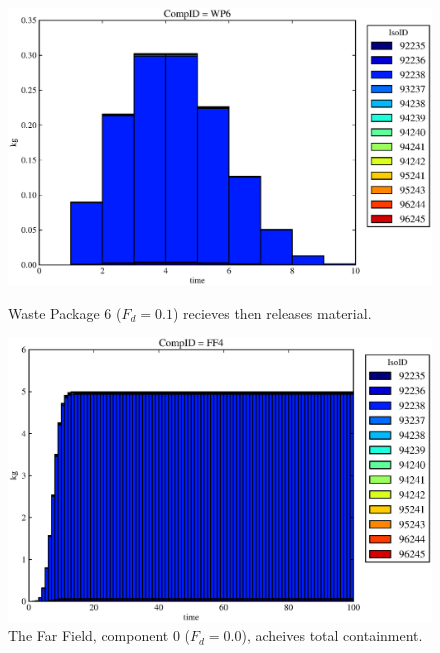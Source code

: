 \begin{figure}[ht]
\begin{minipage}[b]{0.45\linewidth}
\end{minipage}
\hspace{0.05\linewidth}
\begin{minipage}[b]{0.45\linewidth}
  \includegraphics[width=\textwidth]{./chapters/demonstration/base/drIV2.eps}
  \caption[Case DRIII Waste Package Contaminants.]{ 
    Waste Package 6 ($F_d = 0.1$) recieves then releases material. 
    }
  \label{fig:drIVwp6}

  \includegraphics[width=\textwidth]{./chapters/demonstration/base/drIV0.eps}
  \caption[Case DRIII Waste Package Contaminants.]{ 
    The Far Field, component 0 ($F_d = 0.0$), acheives total containment.
    }
  \label{fig:drIVff0}


  \end{minipage}
\end{figure}
